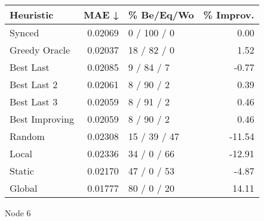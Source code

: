 \begin{tabular}{lrlr}
\toprule
\textbf{Heuristic} & \textbf{MAE ↓} & \textbf{\% Be/Eq/Wo} & \textbf{\% Improv.} \\
\midrule
            Synced &        0.02069 &          0 / 100 / 0 &                0.00 \\
     Greedy Oracle &        0.02037 &          18 / 82 / 0 &                1.52 \\
         Best Last &        0.02085 &           9 / 84 / 7 &               -0.77 \\
       Best Last 2 &        0.02061 &           8 / 90 / 2 &                0.39 \\
       Best Last 3 &        0.02059 &           8 / 91 / 2 &                0.46 \\
    Best Improving &        0.02059 &           8 / 90 / 2 &                0.46 \\
            Random &        0.02308 &         15 / 39 / 47 &              -11.54 \\
             Local &        0.02336 &          34 / 0 / 66 &              -12.91 \\
            Static &        0.02170 &          47 / 0 / 53 &               -4.87 \\
            Global &        0.01777 &          80 / 0 / 20 &               14.11 \\
\bottomrule
\end{tabular}
\caption{Node 6}
\label{tab:non_lr05_le1_bs4_6}
